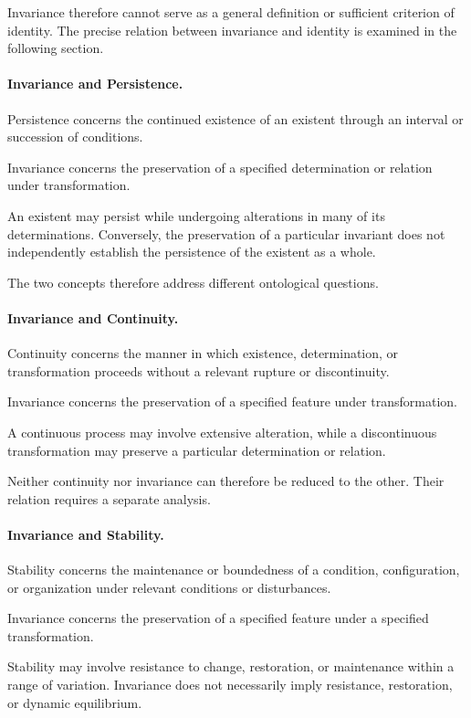 Invariance therefore cannot serve as a general definition
or sufficient criterion of identity. The precise relation
between invariance and identity is examined in the
following section.

\paragraph{Invariance and Persistence.}

Persistence concerns the continued existence of an
existent through an interval or succession of conditions.

Invariance concerns the preservation of a specified
determination or relation under transformation.

An existent may persist while undergoing alterations
in many of its determinations. Conversely, the
preservation of a particular invariant does not
independently establish the persistence of the existent
as a whole.

The two concepts therefore address different ontological
questions.

\paragraph{Invariance and Continuity.}

Continuity concerns the manner in which existence,
determination, or transformation proceeds without
a relevant rupture or discontinuity.

Invariance concerns the preservation of a specified
feature under transformation.

A continuous process may involve extensive alteration,
while a discontinuous transformation may preserve
a particular determination or relation.

Neither continuity nor invariance can therefore be
reduced to the other. Their relation requires a
separate analysis.

\paragraph{Invariance and Stability.}

Stability concerns the maintenance or boundedness
of a condition, configuration, or organization under
relevant conditions or disturbances.

Invariance concerns the preservation of a specified
feature under a specified transformation.

Stability may involve resistance to change, restoration,
or maintenance within a range of variation. Invariance
does not necessarily imply resistance, restoration,
or dynamic equilibrium.

